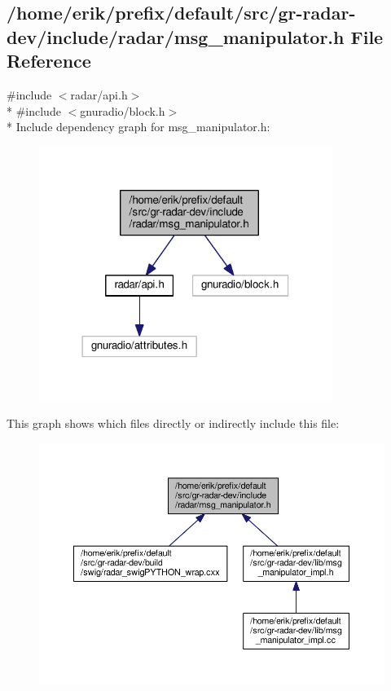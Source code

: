 \subsection{/home/erik/prefix/default/src/gr-\/radar-\/dev/include/radar/msg\+\_\+manipulator.h File Reference}
\label{msg__manipulator_8h}
{\ttfamily \#include $<$radar/api.\+h$>$}\\*
{\ttfamily \#include $<$gnuradio/block.\+h$>$}\\*
Include dependency graph for msg\+\_\+manipulator.\+h\+:
\nopagebreak
\begin{figure}[H]
\begin{center}
\leavevmode
\includegraphics[width=270pt]{df/dd5/msg__manipulator_8h__incl}
\end{center}
\end{figure}
This graph shows which files directly or indirectly include this file\+:
\nopagebreak
\begin{figure}[H]
\begin{center}
\leavevmode
\includegraphics[width=350pt]{dc/d06/msg__manipulator_8h__dep__incl}
\end{center}
\end{figure}
